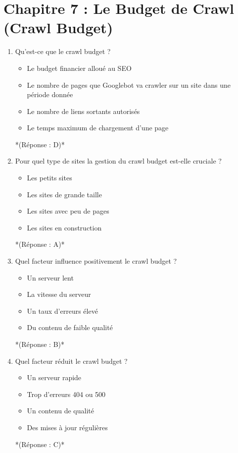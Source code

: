 \documentclass[12pt,a4paper,twoside]{report}
\begin{document}
\newpage

\section*{Chapitre 7 : Le Budget de Crawl (Crawl Budget)}

\begin{enumerate}
\item Qu'est-ce que le crawl budget ?
\begin{itemize}
\item[A)] Le budget financier alloué au SEO
\item[B)] Le nombre de pages que Googlebot va crawler sur un site dans une période donnée
\item[C)] Le nombre de liens sortants autorisés
\item[D)] Le temps maximum de chargement d'une page
\end{itemize}
*(Réponse : D)*

\item Pour quel type de sites la gestion du crawl budget est-elle cruciale ?
\begin{itemize}
\item[A)] Les petits sites
\item[B)] Les sites de grande taille
\item[C)] Les sites avec peu de pages
\item[D)] Les sites en construction
\end{itemize}
*(Réponse : A)*

\item Quel facteur influence positivement le crawl budget ?
\begin{itemize}
\item[A)] Un serveur lent
\item[B)] La vitesse du serveur
\item[C)] Un taux d'erreurs élevé
\item[D)] Du contenu de faible qualité
\end{itemize}
*(Réponse : B)*

\item Quel facteur réduit le crawl budget ?
\begin{itemize}
\item[A)] Un serveur rapide
\item[B)] Trop d'erreurs 404 ou 500
\item[C)] Un contenu de qualité
\item[D)] Des mises à jour régulières
\end{itemize}
*(Réponse : C)*


\end{enumerate}
\end{document}
